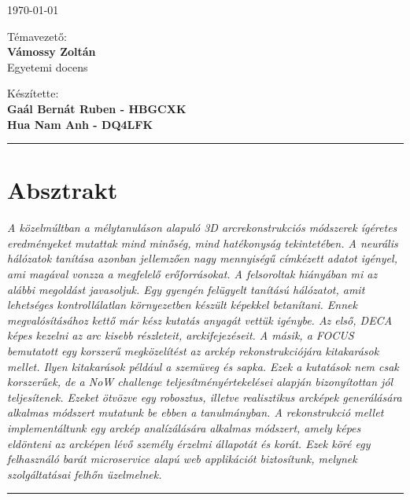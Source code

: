 \documentclass[12pt,a4]{article}
\begin{document}
\begin{titlepage}
\begin{center}
			\vspace{0.2cm}
			\large
			\today
			
			\vspace{1cm}
			
			Témavezető:\\
			\textbf{Vámossy Zoltán}\\
			Egyetemi docens
			
			\vspace{1cm}
			
			Készítette:\\
			\textbf{Gaál Bernát Ruben - HBGCXK\\
			Hua Nam Anh - DQ4LFK}					
		\end{center}
	\end{titlepage}
	\renewcommand*\contentsname{Tartalomjegyzék}
	\tableofcontents
	\newpage
	\par\noindent\rule{\textwidth}{0.4pt}
	\section*{Absztrakt}
     \emph{
		A közelmúltban a mélytanuláson alapuló 3D arcrekonstrukciós módszerek
		ígéretes eredményeket mutattak mind minőség, mind hatékonyság tekintetében. A neurális hálózatok tanítása azonban jellemzően nagy mennyiségű címkézett
		adatot igényel, ami magával vonzza a megfelelő erőforrásokat.
		A felsoroltak hiányában mi az alábbi megoldást javasoljuk. Egy gyengén
		felügyelt tanítású hálózatot, amit lehetséges kontrollálatlan környezetben készült képekkel betanítani.
		Ennek megvalósításához kettő már kész kutatás anyagát vettük igénybe. Az
		első, \cite{deca}DECA képes kezelni az arc kisebb részleteit, arckifejezéseit. A
		másik, a \cite{focus}FOCUS bemutatott egy korszerű megközelítést az arckép rekonstrukciójára kitakarások mellet. Ilyen kitakarások például a szemüveg és sapka. Ezek a kutatások nem csak korszerűek, de a NoW challenge teljesítményértekelései alapján bizonyítottan jól teljesítenek. Ezeket ötvözve egy robosztus, illetve realisztikus
		arcképek generálására alkalmas módszert mutatunk be ebben a tanulmányban.
		A rekonstrukció mellet implementáltunk egy arckép analízálására alkalmas módszert, amely képes eldönteni az arcképen lévő személy érzelmi
		állapotát és korát. Ezek köré egy felhasználó barát microservice alapú web
		applikációt biztosítunk, melynek szolgáltatásai felhőn üzelmelnek.
		}
	   \par\noindent\rule{\textwidth}{0.4pt}
\end{document}
